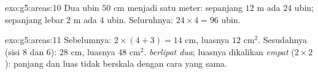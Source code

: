 \begin{solution}{exo:g5:areas:10}
Dua ubin $50$ cm menjadi satu meter: sepanjang $12$ m ada $24$
ubin; sepanjang lebar $2$ m ada $4$ ubin. Seluruhnya:
$24 \times 4 = 96$ ubin.
\end{solution}

\begin{solution}{exo:g5:areas:11}
Sebelumnya:  $2 \times (4 + 3) = 14$ cm, luasnya $12$
cm$^2$. Sesudahnya (sisi $8$ dan $6$):  $28$ cm, luasnya
$48$ cm$^2$.  \emph{berlipat dua}; luasnya dikalikan
\emph{empat} ($2 \times 2$): panjang dan luas tidak berskala dengan
cara yang sama.

\end{solution}
